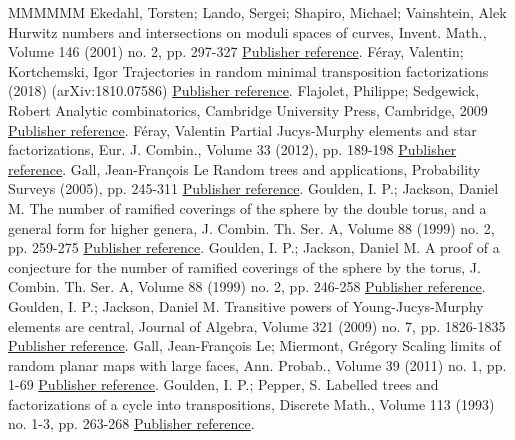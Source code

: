 \documentclass[11pt]{article}
\theoremstyle{definition}
\numberwithin{equation}{section}
\numberwithin{figure}{section}
\numberwithin{table}{section}
\begin{document}
\begin{thebibliography}{MMMMMM}
 Ekedahl, Torsten; Lando, Sergei; Shapiro, Michael; Vainshtein, Alek Hurwitz numbers and intersections on moduli spaces of curves, Invent. Math., Volume 146 (2001) no. 2, pp. 297-327 \href{https://ahl.centre-mersenne.org/item/AHL_2018__1__149_0/#ELSV}{Publisher reference}.
 Féray, Valentin; Kortchemski, Igor Trajectories in random minimal transposition factorizations (2018) (arXiv:1810.07586) \href{https://ahl.centre-mersenne.org/item/AHL_2018__1__149_0/#FK18}{Publisher reference}.
 Flajolet, Philippe; Sedgewick, Robert Analytic combinatorics, Cambridge University Press, Cambridge, 2009 \href{https://ahl.centre-mersenne.org/item/AHL_2018__1__149_0/#FS09}{Publisher reference}.
 Féray, Valentin Partial Jucys-Murphy elements and star factorizations, Eur. J. Combin., Volume 33 (2012), pp. 189-198 \href{https://ahl.centre-mersenne.org/item/AHL_2018__1__149_0/#Fer12}{Publisher reference}.
 Gall, Jean-François Le Random trees and applications, Probability Surveys (2005), pp. 245-311 \href{https://ahl.centre-mersenne.org/item/AHL_2018__1__149_0/#LG05}{Publisher reference}.
 Goulden, I. P.; Jackson, Daniel M. The number of ramified coverings of the sphere by the double torus, and a general form for higher genera, J. Combin. Th. Ser. A, Volume 88 (1999) no. 2, pp. 259-275 \href{https://ahl.centre-mersenne.org/item/AHL_2018__1__149_0/#GJ99B}{Publisher reference}.
 Goulden, I. P.; Jackson, Daniel M. A proof of a conjecture for the number of ramified coverings of the sphere by the torus, J. Combin. Th. Ser. A, Volume 88 (1999) no. 2, pp. 246-258 \href{https://ahl.centre-mersenne.org/item/AHL_2018__1__149_0/#GJ99A}{Publisher reference}.
 Goulden, I. P.; Jackson, Daniel M. Transitive powers of Young-Jucys-Murphy elements are central, Journal of Algebra, Volume 321 (2009) no. 7, pp. 1826-1835 \href{https://ahl.centre-mersenne.org/item/AHL_2018__1__149_0/#GouldenJackson2009}{Publisher reference}.
 Gall, Jean-François Le; Miermont, Grégory Scaling limits of random planar maps with large faces, Ann. Probab., Volume 39 (2011) no. 1, pp. 1-69 \href{https://ahl.centre-mersenne.org/item/AHL_2018__1__149_0/#LGM09}{Publisher reference}.
 Goulden, I. P.; Pepper, S. Labelled trees and factorizations of a cycle into transpositions, Discrete Math., Volume 113 (1993) no. 1-3, pp. 263-268 \href{https://ahl.centre-mersenne.org/item/AHL_2018__1__149_0/#GP93}{Publisher reference}.

\end{thebibliography}
\end{document}
